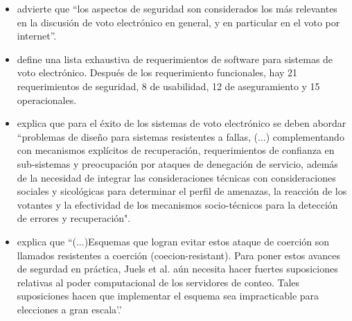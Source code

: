 \begin{itemize}
	\item \cite{Schryen2009} advierte que ``los aspectos de seguridad son considerados los más relevantes 
	en la discusión de voto electrónico en general, y en particular en el voto por internet''.
				
	\item \cite{Notations2009} define una lista exhaustiva de requerimientos de software para 
		sistemas de voto electrónico. Después de los requerimiento funcionales, hay 21 requerimientos de 
		seguridad, 8 de usabilidad, 12 de aseguramiento y 15 operacionales.
		
	\item \cite{Bryans2006} explica que para el éxito de los sistemas de voto electrónico se deben abordar ``problemas de diseño para sistemas resistentes
		a fallas, (...) complementando con mecanismos explícitos de recuperación, requerimientos de confianza en sub-sistemas y 
		preocupación por ataques de denegación de servicio, además de la necesidad de integrar las consideraciones técnicas con
		consideraciones sociales y sicológicas para determinar el perfil de amenazas, la reacción de los votantes y la efectividad de 
		los mecanismos socio-técnicos para la detección de errores y recuperación".
		
	\item \cite{Spycher2012} explica que ``(...)Esquemas que logran evitar estos ataque de coerción son llamados resistentes
		 a coerción (coecion-resistant). Para poner estos avances de segurdad en práctica, Juels et al. aún necesita hacer 
		fuertes suposiciones relativas al poder computacional de los servidores de conteo. Tales suposiciones hacen que implementar
		el esquema sea impracticable para elecciones a gran escala'.'
\end{itemize}

